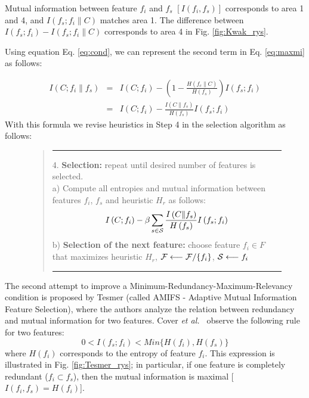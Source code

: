 \documentclass[a4paper,fleqn]{report}
\def\etal{{\em et al.\ }}
\newcommand\cF{{\cal F}}
\newcommand\cS{{\cal S}}
\begin{document}
Mutual information between feature $f_i$ and $f_s$ $ \left[ I \left( f_i, f_s \right) \right]$ corresponds to area 1 and 4, 
and $ I \left(f_s; f_i \| C \right) $ matches area 1.
The difference between $ I \left(f_s; f_i \right) - I \left(f_s; f_i \| C \right) $ corresponds to area 4 
in Fig. \ref{fig:Kwak_rys}. 

Using equation Eq. \ref{eq:cond}, we can represent the second term in Eq. \ref{eq:maxmi} as follows: 

\begin{eqnarray}
I \left(C; f_i\| f_s \right) & = & I \left(C; f_i \right) - \left( 1 - \frac{H\left(f_c \| C \right)}{H \left( f_s\right)} \right) I \left(f_s; f_i \right) \\ \nonumber
                             & = & I \left(C; f_i \right) - \frac{ I \left(C \| f_s \right)}{H \left( f_s\right)} I \left(f_s; f_i \right)
\end{eqnarray}
\newpage
With this formula we revise heuristics in Step 4 in the selection algorithm as follows:

\begin{figure}[ht] \label{it:quote:gfal}  
\vspace*{-0.4cm}
\centering
\begin{quote}
\hrule width 5.6 in
\vspace{0.2cm}
4. {\bf Selection:} repeat until desired number of features is selected. \\
  a) Compute all entropies and mutual information between features $f_i$, $f_s$ and heuristic $H_r$ as follows: \\
      \begin{equation} \label{eq:mifsu} I \left(C; f_i \right) - \beta \sum_{s \in \cS} \frac{ I \left(C \| f_s \right)}{H \left( f_s\right)} I \left(f_s; f_i \right) \end{equation}
  b) {\bf Selection of the next feature:} choose feature $f_i \in F$ that maximizes heuristic $H_r$, $ \cF \longleftarrow \cF / \{f_i\} $, $ \cS \longleftarrow {f_i} $ \\
 \vspace{0.2cm}
 \hrule width 5.6 in
\end{quote}
\end{figure}


The second attempt to improve a Minimum-Redundancy-Maximum-Relevancy condition is proposed by Tesmer \cite{Tesmer2004} 
(called AMIFS - Adaptive Mutual Information Feature Selection), where the authors 
analyze the relation between redundancy and mutual information for two features. 
Cover \etal \cite{Cover1991} observe the following rule for two features:
\begin{equation}
0 < I \left(f_s; f_i \right) < Min \{ H(f_i), H(f_s) \}
\end{equation}
where $ H \left( f_i \right) $ corresponds to the entropy of feature $f_i$. This expression is illustrated in Fig. 
\ref{fig:Tesmer_rys}; in particular, if one feature is completely redundant ($f_i \subset f_s$),
 then the mutual information is maximal [$I\left( f_i,f_s \right)=H\left(f_i\right)$].
\end{document}
